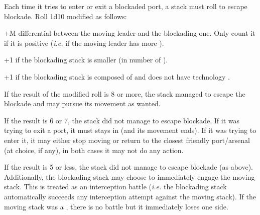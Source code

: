 Each time it tries to enter or exit a blockaded port, a stack must roll to
escape blockade. Roll 1d10 modified as follows:
\begin{modlist}
\item[+M] \Man differential between the moving leader and the blockading
  one. Only count it if it is positive (\emph{i.e.} if the moving leader has
  more \Man).
\item[+1] if the blockading stack is smaller (in number of \ND).
\item[+1] if the blockading stack is composed of \NWD and does not have
  technology \TSF.
\end{modlist}

If the result of the modified roll is 8 or more, the stack managed to escape
the blockade and may pursue its movement as wanted.

If the result is 6 or 7, the stack did not manage to escape blockade. If it
was trying to exit a port, it must stays in (and its movement ends). If it was
trying to enter it, it may either stop moving or return to the closest
friendly port/arsenal (at choice, if any), in both cases it may not do any
action.

If the result is 5 or less, the stack did not manage to escape blockade (as
above). Additionally, the blockading stack may choose to immediately engage
the moving stack. This is treated as an interception battle (\emph{i.e.} the
blockading stack automatically succeeds any interception attempt against the
moving stack). If the moving stack was a \corsaire, there is no battle but it
immediately loses one side.


